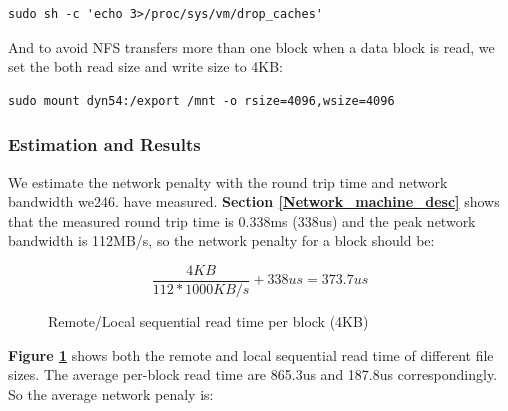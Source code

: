 \begin{lstlisting}
sudo sh -c 'echo 3>/proc/sys/vm/drop_caches'
\end{lstlisting}

And to avoid NFS transfers more than one block when a data block is read, we set the both read size and write size to 4KB:

\begin{lstlisting}
sudo mount dyn54:/export /mnt -o rsize=4096,wsize=4096
\end{lstlisting}


\subsubsection{Estimation and Results}
We estimate the network penalty with the round trip time and network bandwidth we246. have measured. \textbf{Section \ref{Network_machine_desc}} shows that the measured round trip time is 0.338ms (338us) and the peak network bandwidth is 112MB/s, so the network penalty for a block should be:

$$\frac{4KB}{112*1000KB/s} + 338us = 373.7us$$

\begin{figure}[ht]
    \centering
    \caption{Remote/Local sequential read time per block (4KB)}
    \label{rseq_read_time}
\end{figure}

\textbf{Figure \ref{rseq_read_time}} shows both the remote and local sequential read time of different file sizes. The average per-block read time are 865.3us and 187.8us correspondingly. So the average network penaly is:

